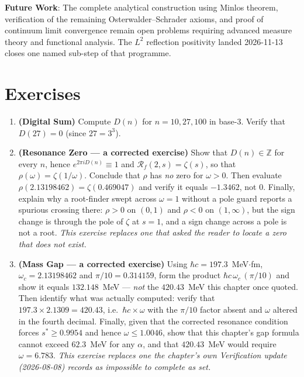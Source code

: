 \textbf{Future Work}: The complete analytical construction using Minlos theorem, verification of the remaining Osterwalder--Schrader axioms, and proof of continuum limit convergence remain open problems requiring advanced measure theory and functional analysis.  The $L^2$ reflection positivity landed 2026-11-13 closes one named sub-step of that programme.

\section*{Exercises}

\begin{enumerate}
\item \textbf{(Digital Sum)} Compute $D(n)$ for $n = 10, 27, 100$ in base-3. Verify that $D(27) = 0$ (since $27 = 3^3$).

\item \textbf{(Resonance Zero --- a corrected exercise)} Show that
$D(n)\in\mathbb{Z}$ for every $n$, hence $e^{2\pi i D(n)}\equiv 1$ and
$\mathcal{R}_f(2,s)=\zeta(s)$, so that $\rho(\omega)=\zeta(1/\omega)$. Conclude
that $\rho$ has \emph{no} zero for $\omega>0$. Then evaluate
$\rho(2.13198462)=\zeta(0.469047)$ and verify it equals $-1.3462$, not $0$.
Finally, explain why a root-finder swept across $\omega=1$ without a pole guard
reports a spurious crossing there: $\rho>0$ on $(0,1)$ and $\rho<0$ on
$(1,\infty)$, but the sign change is through the pole of $\zeta$ at $s=1$, and a
sign change across a pole is not a root. \emph{This exercise replaces one that
asked the reader to locate a zero that does not exist.}

\item \textbf{(Mass Gap --- a corrected exercise)} Using
$\hbar c = 197.3$~MeV$\cdot$fm, $\omega_c = 2.13198462$ and
$\pi/10 = 0.314159$, form the product $\hbar c\,\omega_c\,(\pi/10)$ and show it
equals $\mathbf{132.148}$~MeV --- \emph{not} the $420.43$~MeV this chapter once
quoted. Then identify what was actually computed: verify that
$197.3 \times 2.1309 = 420.43$, i.e.\ $\hbar c \times \omega$ with the $\pi/10$
factor absent and $\omega$ altered in the fourth decimal. Finally, given that
the corrected resonance condition forces $s^*\ge 0.9954$ and hence
$\omega \le 1.0046$, show that this chapter's gap formula cannot exceed
$62.3$~MeV for any $\alpha$, and that $420.43$~MeV would require
$\omega = 6.783$. \emph{This exercise replaces one the chapter's own
Verification update (2026-08-08) records as impossible to complete as set.}


\end{enumerate}

